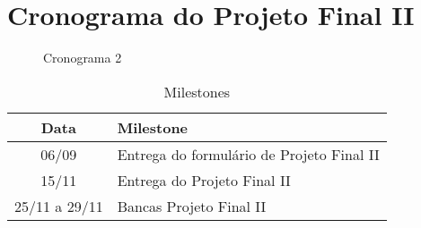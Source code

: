\section{Cronograma do Projeto Final II}

\begin{figure}[ht]
    \begin{center}
    
    \caption{Cronograma 2}
    \label{fig:cronograma-planejado}
    \end{center}
\end{figure}

\begin{table}[h]
    \centering
    \caption{Milestones}
    \begin{tabular}{|c|l|}
        \hline
        \textbf{Data} & \textbf{Milestone} \\
        \hline
        06/09 & Entrega do formulário de Projeto Final II \\
        15/11 & Entrega do Projeto Final II \\
        25/11 a 29/11 & Bancas Projeto Final II \\
        \hline
    \end{tabular}
\end{table}